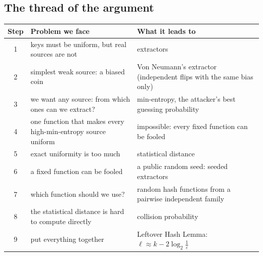\subsection{The thread of the argument}

\begin{table}[H]
  \centering
  \small
  \begin{tabularx}{\textwidth}{@{}cXX@{}}
    \toprule
    \textbf{Step} & \textbf{Problem we face} & \textbf{What it leads to} \\
    \midrule
    1 & keys must be uniform, but real sources are not & extractors \\
    2 & simplest weak source: a biased coin & Von Neumann's extractor (independent flips with the same bias only) \\
    3 & we want any source: from which ones can we extract? & min-entropy, the attacker's best guessing probability \\
    4 & one function that makes every high-min-entropy source uniform & impossible: every fixed function can be fooled \\
    5 & exact uniformity is too much & statistical distance \\
    6 & a fixed function can be fooled & a public random seed: seeded extractors \\
    7 & which function should we use? & random hash functions from a pairwise independent family \\
    8 & the statistical distance is hard to compute directly & collision probability \\
    9 & put everything together & Leftover Hash Lemma: $\ell \approx k - 2\log_2\frac{1}{\varepsilon}$ \\
    \bottomrule
  \end{tabularx}
\end{table}
